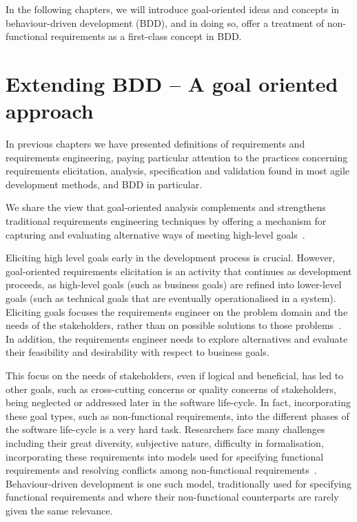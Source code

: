 \documentclass[dissertation,final]{softeng}
\newcommand{\nfrs}{non-functional requirements\xspace}
\begin{document}
In the following chapters, we will introduce goal-oriented ideas and concepts in behaviour-driven development (BDD), and in doing so, offer a treatment of \nfrs as a first-class concept in BDD.

\chapter{Extending BDD -- A goal oriented approach}
\label{ch:Extendingbdd}
In previous chapters we have presented definitions of requirements and requirements engineering, paying particular attention to the practices concerning requirements elicitation, analysis, specification and validation found in most agile development methods, and BDD in particular.

We share the view that goal-oriented analysis complements and strengthens traditional requirements engineering techniques by offering a mechanism for capturing and evaluating alternative ways of meeting high-level goals~\citep{MylopoulosExpl2001}.

Eliciting high level goals early in the development process is crucial. However, goal-oriented requirements elicitation is an activity that continues as development proceeds, as high-level goals (such as business goals) are refined into lower-level goals (such as technical goals that are eventually operationalised in a system). Eliciting goals focuses the requirements engineer on the problem domain and the needs of the stakeholders, rather than on possible solutions to those problems~\citep{Nuseibeh:2000ub}. In addition, the requirements engineer needs to explore alternatives and evaluate their feasibility and desirability with respect to business goals.

This focus on the needs of stakeholders, even if logical and beneficial, has led to other goals, such as cross-cutting concerns or quality concerns of stakeholders, being neglected or addressed later in the software life-cycle. In fact, incorporating these goal types, such as \nfrs, into the different phases of the software life-cycle is a very hard task. Researchers face many challenges including their great diversity,  subjective nature, difficulty in formalisation, incorporating these requirements into models used for specifying functional requirements and resolving conflicts among \nfrs~\citep{Matoussi:2008wr}. Behaviour-driven development is one such model, traditionally used for specifying functional requirements and where their non-functional counterparts are rarely given the same relevance. 
\end{document}

